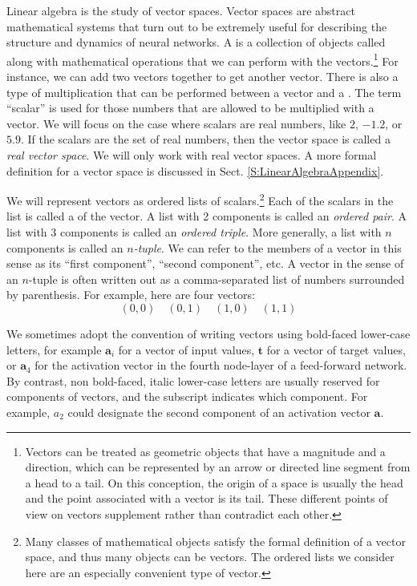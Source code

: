     Linear algebra is the study of vector spaces. Vector spaces are abstract
mathematical systems that turn out to be extremely useful for describing the 
structure and dynamics of neural networks. A  is a 
collection of objects called  along with mathematical 
operations that we can perform with the vectors.\footnote{Vectors can be treated as geometric objects that have a magnitude and a direction, which can be represented by an arrow or directed line segment from a head to a tail.  On this conception, the origin of a space is usually the head and the point associated with a vector is its tail.  These different points of view on vectors supplement rather than contradict each 
other. }\label{headTail}  For instance, we can add two vectors together to get another vector. There is also a type of 
multiplication that can be performed between a vector and a . The term ``scalar'' is used for those numbers that are allowed to be 
multiplied with a vector. We will focus on the case where scalars are real numbers, like $2$, $-1.2$, or $5.9$. If the scalars are the set of real numbers, then the 
vector space is called a {\em real vector space}. We will only work with real
vector spaces. A more formal definition for a vector space is discussed in 
Sect. \ref{S:LinearAlgebraAppendix}. 

We will represent vectors as ordered lists of scalars.\footnote{ Many classes of mathematical objects satisfy the formal definition
of a vector space, and thus many objects can be vectors. The ordered lists we consider here are an especially convenient type of vector.} Each of the scalars in the list is called a  
of the vector. A list with 2 components is called an {\em ordered pair}. A 
list with 3 components is called an {\em ordered triple}. More generally, a
list with $n$ components is called an {\em $n$-tuple}. We can refer to the
members of a vector in this sense  as its ``first component'',  ``second component'', etc.
A vector in the sense of an $n$-tuple is often 
written out as a comma-separated list of numbers surrounded by parenthesis. 
For example, here are four vectors:
\begin{equation*}
    (0,0) \quad (0,1) \quad (1,0) \quad (1,1) 
\end{equation*}

   We sometimes adopt the convention of writing vectors using bold-faced 
lower-case letters, for example $\mathbf{a}_i$ for a  vector of input values, 
$\mathbf{t}$ for a vector of target values, or $\mathbf{a}_4$ for the 
activation vector in the fourth node-layer of a feed-forward network. By 
contrast, non bold-faced, italic lower-case letters are usually reserved for 
components of vectors, and the subscript indicates which component. For 
example, $a_2$ could designate the second component of an activation vector 
$\mathbf{a}$.

